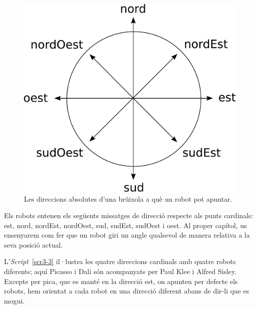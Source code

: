 \begin{figure}[h]
\begin{center}
\includegraphics[scale=0.25]{Imatges/figura3-1}
\end{center}
\caption{Les direccions absolutes d'una brúixola a què un robot pot apuntar.}
\label{fig0301}
\end{figure}

Els robots entenen els següents missatges de direcció respecte als punts cardinals: \textsf{est}, \textsf{nord}, \textsf{nordEst}, \textsf{nordOest}, \textsf{sud}, \textsf{sudEst}, \textsf{sudOest} i  \textsf{oest}. Al proper capítol, us ensenyarem com fer que un robot giri un angle qualsevol de manera relativa a la seva posició actual.         

L'\emph{Script}~\ref{scr3-3} il·lustra les quatre direccions cardinals amb quatre robots diferents; aquí Picasso i Dali són acompanyats per Paul Klee i Alfred Sisley. Excepte per \textsf{pica}, que es manté en la direcció \textsf{est}, on apunten per defecte els robots, hem orientat a cada robot en una direcció diferent abans de dir-li que es mogui.

